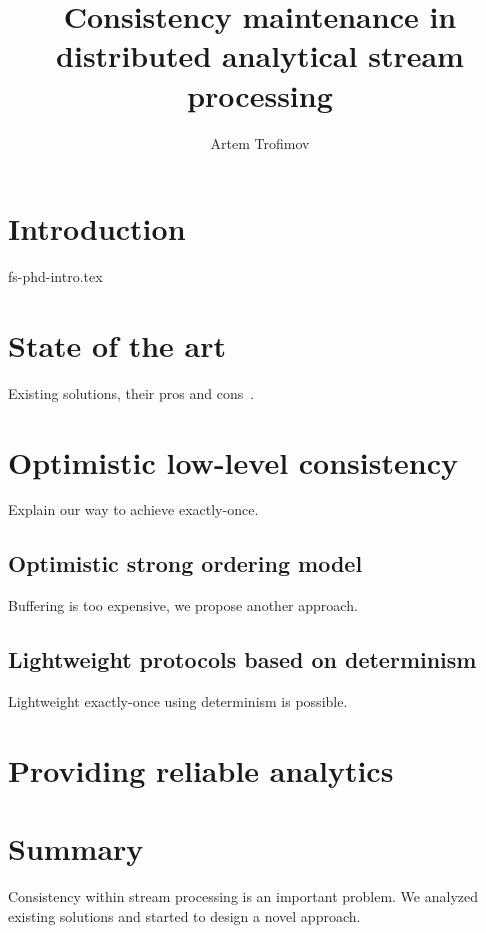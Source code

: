 \documentclass{llncs}
\begin{document}
\title {Consistency maintenance in distributed analytical stream processing}
\author{Artem Trofimov}

\maketitle

\begin{abstract}

\end {abstract}

\section {Introduction}
 {fs-phd-intro.tex}

\section {State of the art}
\label{fs-phd-related}
Existing solutions, their pros and cons~\cite{Carbone:2017:SMA:3137765.3137777, Zaharia:2012:DSE:2342763.2342773}. 

\section {Optimistic low-level consistency}
\label{fs-phd-optimistic}
Explain our way to achieve exactly-once.

\subsection{Optimistic strong ordering model}
Buffering is too expensive, we propose another approach.

\subsection{Lightweight protocols based on determinism}
Lightweight exactly-once using determinism is possible. 

\section{Providing reliable analytics}
\label{fs-phd-reliable}

\section {Summary}
\label{fs-phd-summary}
Consistency within stream processing is an important problem. We analyzed existing solutions and started to design a novel approach.



\end{document}
